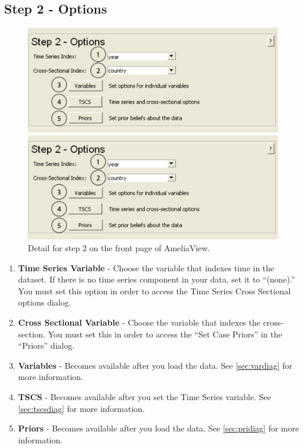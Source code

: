 \documentclass[12pt,titlepage]{article}
\begin{document}
\subsection{Step 2 - Options}

\label{sec:step2}
\begin{figure}[ht]
  \centering
  \begin{htmlonly} 
    \includegraphics[scale=1]{step2} 
  \end{htmlonly}
  \begin{latexonly}
    \includegraphics[scale=.75]{step2}
  \end{latexonly}
  \caption{Detail for step 2 on the front page of AmeliaView.}
\end{figure}
\begin{enumerate}
\item \textbf{Time Series Variable} - Choose the variable that indexes
  time in the dataset.  If there is no time series component in your
  data, set it to ``(none).''  You must set this option in order to
  access the Time Series Cross Sectional options dialog.
\item \textbf{Cross Sectional Variable} - Choose the variable that
  indexes the cross-section.  You must set this in order to access the
  ``Set Case Priors'' in the ``Priors'' dialog.
\item \textbf{Variables} - Becomes available after you load the data.
  See \ref{sec:vardiag} for more information.
\item \textbf{TSCS} - Becomes available after you set the Time Series
  variable.  See \ref{sec:tscsdiag} for more information.
\item \textbf{Priors} - Becomes available after you load the data.
  See \ref{sec:pridiag} for more information.
\end{enumerate}
\end{document}
